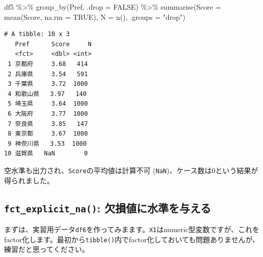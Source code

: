 \documentclass[
  a4paper,
  pandoc,
  ja=standard,
  jafont=haranoaji]{bxjsbook}
\newenvironment{Shaded}{\begin{snugshade}}{\end{snugshade}}
\newcommand{\AttributeTok}[1]{\textcolor[rgb]{0.00,0.48,0.65}{#1}}
\newcommand{\ConstantTok}[1]{\textcolor[rgb]{0.56,0.35,0.01}{#1}}
\newcommand{\FunctionTok}[1]{\textcolor[rgb]{0.28,0.35,0.67}{#1}}
\newcommand{\NormalTok}[1]{\textcolor[rgb]{0.00,0.48,0.65}{#1}}
\newcommand{\SpecialCharTok}[1]{\textcolor[rgb]{0.37,0.37,0.37}{#1}}
\newcommand{\StringTok}[1]{\textcolor[rgb]{0.13,0.47,0.30}{#1}}
\begin{document}
\begin{Shaded}
\begin{Highlighting}[numbers=left,,]
\NormalTok{df5 }\SpecialCharTok{\%\textgreater{}\%}
  \FunctionTok{group\_by}\NormalTok{(Pref, }\AttributeTok{.drop =} \ConstantTok{FALSE}\NormalTok{) }\SpecialCharTok{\%\textgreater{}\%}
  \FunctionTok{summarise}\NormalTok{(}\AttributeTok{Score   =} \FunctionTok{mean}\NormalTok{(Score, }\AttributeTok{na.rm =} \ConstantTok{TRUE}\NormalTok{),}
            \AttributeTok{N       =} \FunctionTok{n}\NormalTok{(),}
            \AttributeTok{.groups =} \StringTok{"drop"}\NormalTok{)}
\end{Highlighting}
\end{Shaded}

\begin{verbatim}
# A tibble: 10 x 3
   Pref      Score     N
   <fct>     <dbl> <int>
 1 京都府     3.68   414
 2 兵庫県     3.54   591
 3 千葉県     3.72  1000
 4 和歌山県   3.97   140
 5 埼玉県     3.64  1000
 6 大阪府     3.77  1000
 7 奈良県     3.85   147
 8 東京都     3.67  1000
 9 神奈川県   3.53  1000
10 滋賀県   NaN        0
\end{verbatim}

空水準も出力され、\texttt{Score}の平均値は計算不可
(\texttt{NaN})、ケース数は0という結果が得られました。

\hypertarget{fct_explicit_na-ux6b20ux640dux5024ux306bux6c34ux6e96ux3092ux4e0eux3048ux308b}{%
\subsection{\texorpdfstring{\texttt{fct\_explicit\_na()}:
欠損値に水準を与える}{fct\_explicit\_na(): 欠損値に水準を与える}}\label{fct_explicit_na-ux6b20ux640dux5024ux306bux6c34ux6e96ux3092ux4e0eux3048ux308b}}

まずは、実習用データ\texttt{df6}を作ってみまます。\texttt{X1}はnumeric型変数ですが、これをfactor化します。最初から\texttt{tibble()}内でfactor化しておいても問題ありませんが、練習だと思ってください。
\end{document}
